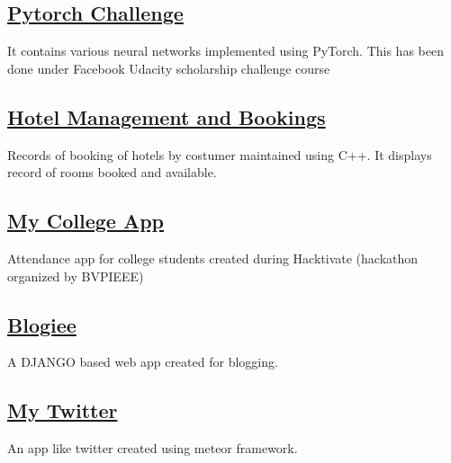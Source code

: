 \documentclass[]{deedy-resume-openfont}
\begin{document}
\begin{minipage}[t]{0.67\textwidth}
\subsection{\href{https://github.com/thetaniyagupta/pytorch-challenge}{Pytorch Challenge}}
\vspace{\topsep} %
\begin{tightemize}
\item It contains various neural networks implemented using PyTorch. This has been done under Facebook Udacity scholarship challenge course
\end{tightemize}
\sectionsep
\subsection{\href{https://github.com/thetaniyagupta/RECORDS}{Hotel Management and Bookings}} 
\vspace{\topsep} %
\begin{tightemize}
\item Records of booking of hotels by costumer maintained using C++. It displays record of rooms booked and available. 
\end{tightemize}
\sectionsep
\subsection{\href{https://github.com/thetaniyagupta/MYCOLLEGE}{My College App}} 
\vspace{\topsep} %
\begin{tightemize}
\item Attendance app for college students created during Hacktivate (hackathon organized by BVPIEEE) 
\end{tightemize}
\sectionsep
\subsection{\href{https://github.com/thetaniyagupta/BLOGiee}{Blogiee}}
\vspace{\topsep} %
\begin{tightemize}
\item A DJANGO based web app created for blogging.
\end{tightemize}
\sectionsep
\subsection{\href{https://github.com/thetaniyagupta/MYTWITTER}{My Twitter}}
\vspace{\topsep} %
\begin{tightemize}
\item An app like twitter created using meteor framework.
\end{tightemize}
\sectionsep
\sectionsep


\end{minipage}
\end{document}
